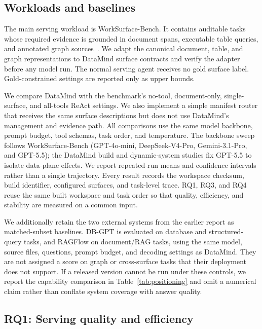 \subsection{Workloads and baselines}
\label{sec:eval-workloads}

The main serving workload is WorkSurface-Bench. It contains auditable tasks
whose required evidence is grounded in document spans, executable table
queries, and annotated graph sources~\cite{worksurfacebench2026}. We adapt the
canonical document, table, and graph representations to DataMind surface
contracts and verify the adapter before any model run. The normal serving
agent receives no gold surface label. Gold-constrained settings are reported
only as upper bounds.

We compare DataMind with the benchmark's no-tool, document-only,
single-surface, and all-tools ReAct settings. We also implement a simple
manifest router that receives the same surface descriptions but does not use
DataMind's management and evidence path. All comparisons use the same
model backbone, prompt budget, tool schemas, task order, and temperature. The
backbone sweep follows WorkSurface-Bench (GPT-4o-mini, DeepSeek-V4-Pro,
Gemini-3.1-Pro, and GPT-5.5); the DataMind build and dynamic-system studies
fix GPT-5.5 to isolate data-plane effects. We report repeated-run means and
confidence intervals rather than a single trajectory.
Every result records the workspace checksum, build identifier, configured
surfaces, and task-level trace. RQ1, RQ3, and RQ4 reuse the same built workspace
and task order so that quality, efficiency, and stability are measured on a
common input.

We additionally retain the two external systems from the earlier report as
matched-subset baselines. DB-GPT is evaluated on database and structured-query
tasks, and RAGFlow on document/RAG tasks, using the same model, source files,
questions, prompt budget, and decoding settings as DataMind. They are not
assigned a score on graph or cross-surface tasks that their deployment does not
support. If a released version cannot be run under these controls, we report
the capability comparison in Table~\ref{tab:positioning} and omit a numerical
claim rather than conflate system coverage with answer quality.

\subsection{RQ1: Serving quality and efficiency}
\label{sec:eval-rq1}

